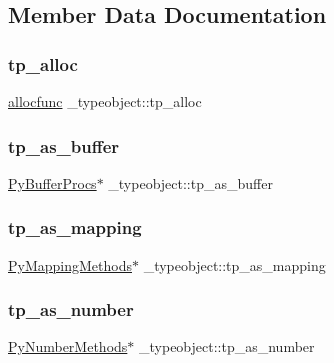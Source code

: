 \subsection{Member Data Documentation}
\mbox{\label{struct__typeobject_a8458b295e2e10393595dc8714bb3c7f6}} 
\subsubsection{\texorpdfstring{tp\_alloc}{tp\_alloc}}
{\footnotesize\ttfamily \mbox{\hyperlink{_python27_2object_8h_a270ff7974d1e76054e6dd1e93557886f}{allocfunc}} \+\_\+typeobject\+::tp\+\_\+alloc}

\mbox{\label{struct__typeobject_a9a413fe33d7a2e14d13197f84cd26cc9}} 
\subsubsection{\texorpdfstring{tp\_as\_buffer}{tp\_as\_buffer}}
{\footnotesize\ttfamily \mbox{\hyperlink{struct_py_buffer_procs}{Py\+Buffer\+Procs}}$\ast$ \+\_\+typeobject\+::tp\+\_\+as\+\_\+buffer}

\mbox{\label{struct__typeobject_a994cf6915913e523db5c29a5c78d4b24}} 
\subsubsection{\texorpdfstring{tp\_as\_mapping}{tp\_as\_mapping}}
{\footnotesize\ttfamily \mbox{\hyperlink{struct_py_mapping_methods}{Py\+Mapping\+Methods}}$\ast$ \+\_\+typeobject\+::tp\+\_\+as\+\_\+mapping}

\mbox{\label{struct__typeobject_a7fe54a45ffad9dea7caa193973ccce1a}} 
\subsubsection{\texorpdfstring{tp\_as\_number}{tp\_as\_number}}
{\footnotesize\ttfamily \mbox{\hyperlink{struct_py_number_methods}{Py\+Number\+Methods}}$\ast$ \+\_\+typeobject\+::tp\+\_\+as\+\_\+number}

